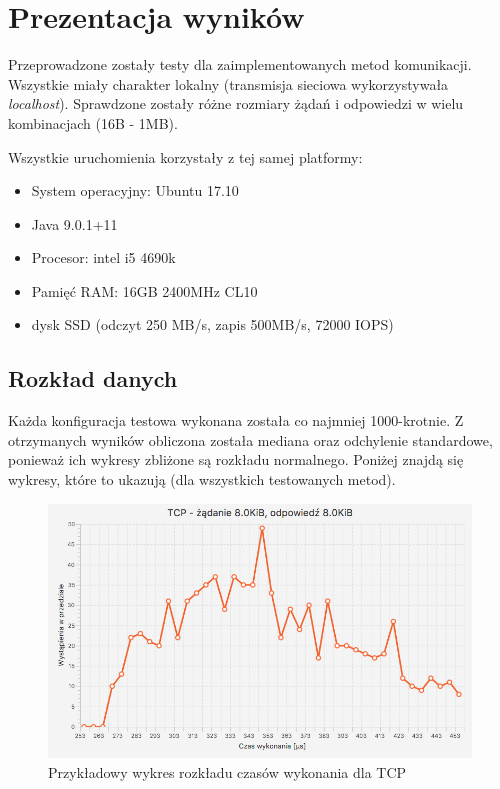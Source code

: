 \chapter{Prezentacja wyników}

Przeprowadzone zostały testy dla zaimplementowanych metod komunikacji. Wszystkie miały charakter lokalny (transmisja sieciowa wykorzystywała \textit{localhost}). Sprawdzone zostały różne rozmiary żądań i odpowiedzi w wielu kombinacjach (16B - 1MB).

Wszystkie uruchomienia korzystały z tej samej platformy:
\begin{itemize}
    \item System operacyjny: Ubuntu 17.10
    \item Java 9.0.1+11
    \item Procesor: intel i5 4690k
    \item Pamięć RAM: 16GB 2400MHz CL10
    \item dysk SSD (odczyt 250 MB/s, zapis 500MB/s, 72000 IOPS)
\end{itemize}


\section{Rozkład danych}

Każda konfiguracja testowa wykonana została co najmniej 1000-krotnie. Z otrzymanych wyników obliczona została mediana oraz odchylenie standardowe, ponieważ ich wykresy zbliżone są rozkładu normalnego. Poniżej znajdą się wykresy, które to ukazują (dla wszystkich testowanych metod).


\begin{figure}[H]
    \centering
    \includegraphics[scale=0.38]{img/charts/TCP_chart_8192_8192.png}
    \caption{Przykładowy wykres rozkładu czasów wykonania dla TCP}
\end{figure}


